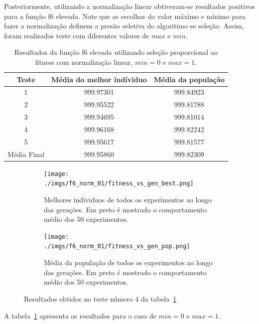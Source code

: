 \documentclass[12pt]{article}
\begin{document}
	Posteriormente, utilizando a normalização linear obtiveram-se resultados positivos para a função f6 elevada.
	Note que as escolhas do valor máximo e mínimo para fazer a normalização definem a presão seletiva do algoritimo
	se seleção. Assim, foram realizados teste com diferentes valores de $max$ e $min$.

	\begin{table}[htb]
		\centering
		\begin{tabular}{|c|c|c|}
			\hline
			\rowcolor[HTML]{9B9B9B}
			Teste & Média do melhor indíviduo & Média da população \\\hline
			1 & 999.97301 & 999.84923 \\\hline
			2 & 999.95522 & 999.81788 \\\hline
			3 & 999.94695 & 999.81014 \\\hline
			4 & 999.96168 & 999.82242 \\\hline
			5 & 999.95617 & 999.81577 \\\hline
			Média Final & 999.95860 & 999.82309 \\\hline
		\end{tabular}
		\caption{Resultados da função f6 elevada utilizando seleção
		proporcional ao fitness com normalização linear, $min = 0$ e $max = 1$. \label{tab:f6_norm_01}}
	\end{table}

	\begin{figure}[htb]
		\begin{subfigure}{.45\textwidth}
			\centering
			\texttt{[image: ./imgs/f6\_norm\_01/fitness\_vs\_gen\_best.png]}
			\caption{Melhores indíviduos de todos os experimentos ao longo das gerações.
			Em preto é mostrado o comportamento médio dos 50 experimentos. }
		\end{subfigure}
		\hfill
		\begin{subfigure}{.45\textwidth}
			\centering
			\texttt{[image: ./imgs/f6\_norm\_01/fitness\_vs\_gen\_pop.png]}
			\caption{Média da população de todos os experimentos ao longo das gerações.
			Em preto é mostrado o comportamento médio dos 50 experimentos.}
		\end{subfigure}
		\caption{Resultados obtidos no teste número 4 da tabela~\ref{tab:f6_norm_01}}
	\end{figure}

	A tabela~\ref{tab:f6_norm_01} apresenta os resultados para o caso de $min = 0$ e $max = 1$.
\end{document}
